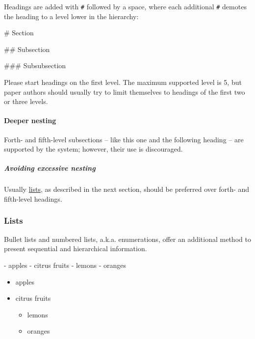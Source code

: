 \documentclass[10pt,a4paper,onecolumn]{article}
\newenvironment{Shaded}{}{}
\newcommand{\FunctionTok}[1]{\textcolor[rgb]{0.02,0.16,0.49}{#1}}
\newcommand{\NormalTok}[1]{#1}
\newcommand{\SpecialStringTok}[1]{\textcolor[rgb]{0.73,0.40,0.53}{#1}}
\providecommand{\tightlist}{%
  \setlength{\itemsep}{0pt}\setlength{\parskip}{0pt}}
\let\oldparagraph\paragraph
\renewcommand{\paragraph}[1]{\oldparagraph{#1}\mbox{}}
\let\oldsubparagraph\subparagraph
\renewcommand{\subparagraph}[1]{\oldsubparagraph{#1}\mbox{}}
\begin{document}
Headings are added with \texttt{\#} followed by a space, where each
additional \texttt{\#} demotes the heading to a level lower in the
hierarchy:

\begin{Shaded}
\begin{Highlighting}[]
\FunctionTok{\# Section}

\FunctionTok{\#\# Subsection}

\FunctionTok{\#\#\# Subsubsection}
\end{Highlighting}
\end{Shaded}

Please start headings on the first level. The maximum supported level is
5, but paper authors should usually try to limit themselves to headings
of the first two or three levels.

\paragraph{Deeper nesting}\label{deeper-nesting}

Forth- and fifth-level subsections -- like this one and the following
heading -- are supported by the system; however, their use is
discouraged.

\subparagraph{Avoiding excessive
nesting}\label{avoiding-excessive-nesting}

Usually \hyperref[lists]{lists}, as described in the next section,
should be preferred over forth- and fifth-level headings.

\subsubsection{Lists}\label{lists}

Bullet lists and numbered lists, a.k.a. enumerations, offer an
additional method to present sequential and hierarchical information.

\begin{Shaded}
\begin{Highlighting}[]
\SpecialStringTok{{-} }\NormalTok{apples}
\SpecialStringTok{{-} }\NormalTok{citrus fruits}
\SpecialStringTok{  {-} }\NormalTok{lemons}
\SpecialStringTok{  {-} }\NormalTok{oranges}
\end{Highlighting}
\end{Shaded}

\begin{itemize}
\tightlist
\item
  apples
\item
  citrus fruits

  \begin{itemize}
  \tightlist
  \item
    lemons
  \item
    oranges
  \end{itemize}
\end{itemize}
\end{document}
